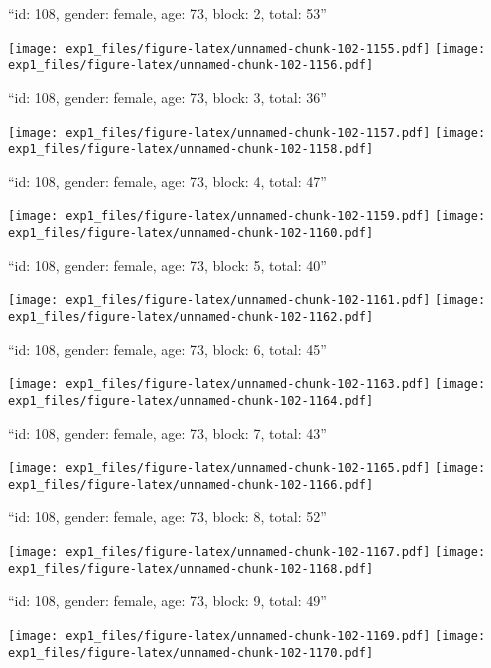 \documentclass[11pt,,]{article}
\begin{document}
\newpage
[1] 

``id: 108, gender: female, age: 73, block: 2, total: 53''

\texttt{[image: exp1\_files/figure-latex/unnamed-chunk-102-1155.pdf]}
\texttt{[image: exp1\_files/figure-latex/unnamed-chunk-102-1156.pdf]}

\newpage
[1] 

``id: 108, gender: female, age: 73, block: 3, total: 36''

\texttt{[image: exp1\_files/figure-latex/unnamed-chunk-102-1157.pdf]}
\texttt{[image: exp1\_files/figure-latex/unnamed-chunk-102-1158.pdf]}

\newpage
[1] 

``id: 108, gender: female, age: 73, block: 4, total: 47''

\texttt{[image: exp1\_files/figure-latex/unnamed-chunk-102-1159.pdf]}
\texttt{[image: exp1\_files/figure-latex/unnamed-chunk-102-1160.pdf]}

\newpage
[1] 

``id: 108, gender: female, age: 73, block: 5, total: 40''

\texttt{[image: exp1\_files/figure-latex/unnamed-chunk-102-1161.pdf]}
\texttt{[image: exp1\_files/figure-latex/unnamed-chunk-102-1162.pdf]}

\newpage
[1] 

``id: 108, gender: female, age: 73, block: 6, total: 45''

\texttt{[image: exp1\_files/figure-latex/unnamed-chunk-102-1163.pdf]}
\texttt{[image: exp1\_files/figure-latex/unnamed-chunk-102-1164.pdf]}

\newpage
[1] 

``id: 108, gender: female, age: 73, block: 7, total: 43''

\texttt{[image: exp1\_files/figure-latex/unnamed-chunk-102-1165.pdf]}
\texttt{[image: exp1\_files/figure-latex/unnamed-chunk-102-1166.pdf]}

\newpage
[1] 

``id: 108, gender: female, age: 73, block: 8, total: 52''

\texttt{[image: exp1\_files/figure-latex/unnamed-chunk-102-1167.pdf]}
\texttt{[image: exp1\_files/figure-latex/unnamed-chunk-102-1168.pdf]}

\newpage
[1] 

``id: 108, gender: female, age: 73, block: 9, total: 49''

\texttt{[image: exp1\_files/figure-latex/unnamed-chunk-102-1169.pdf]}
\texttt{[image: exp1\_files/figure-latex/unnamed-chunk-102-1170.pdf]}
\end{document}
